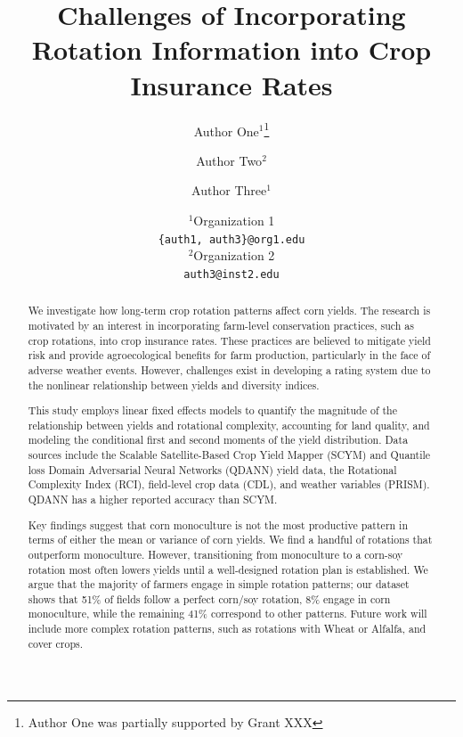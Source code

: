 \documentclass[11pt,letterpaper]{article}
\title{Challenges of Incorporating Rotation Information into Crop Insurance Rates}
\author{Author One$^1$\thanks{Author One was partially supported by Grant XXX} \and Author Two$^2$ \and Author Three$^1$}
\date{
	$^1$Organization 1 \\ \texttt{\{auth1, auth3\}@org1.edu}\\%
	$^2$Organization 2 \\ \texttt{auth3@inst2.edu}\\[2ex]%
}
\theoremstyle{remark}
\theoremstyle{plain}
\theoremstyle{definition}
\begin{document}
	\maketitle
	
	\begin{abstract}
		We investigate how long-term crop rotation patterns affect corn yields. The research is motivated by an interest in incorporating farm-level conservation practices, such as crop rotations, into crop insurance rates. These practices are believed to mitigate yield risk and provide agroecological benefits for farm production, particularly in the face of adverse weather events. However, challenges exist in developing a rating system due to the nonlinear relationship between yields and diversity indices.

    This study employs linear fixed effects models to quantify the magnitude of the relationship between yields and rotational complexity, accounting for land quality, and modeling the conditional first and second moments of the yield distribution. Data sources include the Scalable Satellite-Based Crop Yield Mapper (SCYM) and Quantile loss Domain Adversarial Neural Networks (QDANN) yield data, the Rotational Complexity Index (RCI), field-level crop data (CDL), and weather variables (PRISM). QDANN has a higher reported accuracy than SCYM.

    Key findings suggest that corn monoculture is not the most productive pattern in terms of either the mean or variance of corn yields. We find a handful of rotations that outperform monoculture. However, transitioning from monoculture to a corn-soy rotation most often lowers yields until a well-designed rotation plan is established. We argue that the majority of farmers engage in simple rotation patterns; our dataset shows that 51\% of fields follow a perfect corn/soy rotation, 8\% engage in corn monoculture, while the remaining 41\% correspond to other patterns. Future work will include more complex rotation patterns, such as rotations with Wheat or Alfalfa, and cover crops.



\end{abstract}
\end{document}
